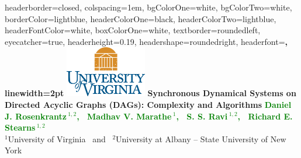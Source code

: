 \documentclass[landscape,a0paper,fontscale=0.285]{baposter} %
\begin{document}
\begin{poster}
{
headerborder=closed, %
colspacing=1em, %
bgColorOne=white, %
bgColorTwo=white, %
borderColor=lightblue, %
headerColorOne=black, %
headerColorTwo=lightblue, %
headerFontColor=white, %
boxColorOne=white, %
textborder=roundedleft, %
eyecatcher=true, %
headerheight=0.19\textheight, %
headershape=roundedright, %
headerfont=\Large\bf\textsc, %
linewidth=2pt %
}
%
{\includegraphics[height=6em]{uva_logo.png}} %
{\textbf{Synchronous Dynamical Systems on Directed Acyclic Graphs (DAGs):
            Complexity and Algorithms}\vspace{0.25em}
} %
{\textcolor{green}{\textbf{Daniel J. Rosenkrantz$\,{}^{1,2}$,~ 
         Madhav V. Marathe$\,{}^1$,~ S. S. Ravi$\,{}^{1,2}$,~
         Richard E. Stearns$\,{}^{1,2}$}}\\ \vspace{0.1em} 
            {$^1$University of Virginia~ and~
            $^2$University at Albany -- State University 
            of New York} \\ \vspace{0.25em}
}
\end{poster}
\end{document}
